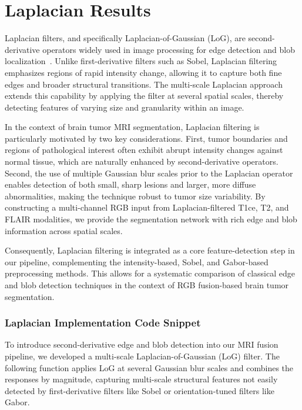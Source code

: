 \section{Laplacian Results}
\label{sec:laplacian_results}

Laplacian filters, and specifically Laplacian-of-Gaussian (LoG), are second-derivative operators widely used in image processing for edge detection and blob localization~\cite{gonzalez2002digital}. Unlike first-derivative filters such as Sobel, Laplacian filtering emphasizes regions of rapid intensity change, allowing it to capture both fine edges and broader structural transitions. The multi-scale Laplacian approach extends this capability by applying the filter at several spatial scales, thereby detecting features of varying size and granularity within an image.

In the context of brain tumor MRI segmentation, Laplacian filtering is particularly motivated by two key considerations. First, tumor boundaries and regions of pathological interest often exhibit abrupt intensity changes against normal tissue, which are naturally enhanced by second-derivative operators. Second, the use of multiple Gaussian blur scales prior to the Laplacian operator enables detection of both small, sharp lesions and larger, more diffuse abnormalities, making the technique robust to tumor size variability. By constructing a multi-channel RGB input from Laplacian-filtered T1ce, T2, and FLAIR modalities, we provide the segmentation network with rich edge and blob information across spatial scales.

Consequently, Laplacian filtering is integrated as a core feature-detection step in our pipeline, complementing the intensity-based, Sobel, and Gabor-based preprocessing methods. This allows for a systematic comparison of classical edge and blob detection techniques in the context of RGB fusion-based brain tumor segmentation.


\subsubsection{Laplacian Implementation Code Snippet}

To introduce second-derivative edge and blob detection into our MRI fusion pipeline, we developed a multi-scale Laplacian-of-Gaussian (LoG) filter. The following function applies LoG at several Gaussian blur scales and combines the responses by magnitude, capturing multi-scale structural features not easily detected by first-derivative filters like Sobel or orientation-tuned filters like Gabor.

